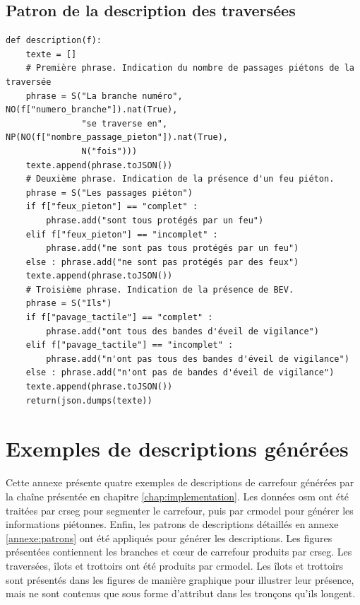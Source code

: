 \begin{appendix}
\section*{Patron de la description des traversées}

\begin{verbatim}
def description(f):
    texte = []
    # Première phrase. Indication du nombre de passages piétons de la traversée
    phrase = S("La branche numéro",  NO(f["numero_branche"]).nat(True), 
               "se traverse en", NP(NO(f["nombre_passage_pieton"]).nat(True), 
               N("fois")))
    texte.append(phrase.toJSON())
    # Deuxième phrase. Indication de la présence d'un feu piéton.
    phrase = S("Les passages piéton")
    if f["feux_pieton"] == "complet" : 
        phrase.add("sont tous protégés par un feu")
    elif f["feux_pieton"] == "incomplet" : 
        phrase.add("ne sont pas tous protégés par un feu")
    else : phrase.add("ne sont pas protégés par des feux")
    texte.append(phrase.toJSON())
    # Troisième phrase. Indication de la présence de BEV.
    phrase = S("Ils")
    if f["pavage_tactile"] == "complet" : 
        phrase.add("ont tous des bandes d'éveil de vigilance")
    elif f["pavage_tactile"] == "incomplet" : 
        phrase.add("n'ont pas tous des bandes d'éveil de vigilance")
    else : phrase.add("n'ont pas de bandes d'éveil de vigilance")
    texte.append(phrase.toJSON())
    return(json.dumps(texte))
\end{verbatim}

\chapter{Exemples de descriptions générées}
\label{annexe:exemples}

Cette annexe présente quatre exemples de descriptions de carrefour générées par la chaîne présentée en chapitre \ref{chap:implementation}. Les données \gls{osm} ont été traitées par crseg pour segmenter le carrefour, puis par crmodel pour générer les informations piétonnes. Enfin, les patrons de descriptions détaillés en annexe \ref{annexe:patrons} ont été appliqués pour générer les descriptions. Les figures présentées contiennent les branches et cœur de carrefour produits par crseg. Les traversées, îlots et trottoirs ont été produits par crmodel. Les îlots et trottoirs sont présentés dans les figures de manière graphique pour illustrer leur présence, mais ne sont contenus que sous forme d'attribut dans les tronçons qu'ils longent.


\end{appendix}
